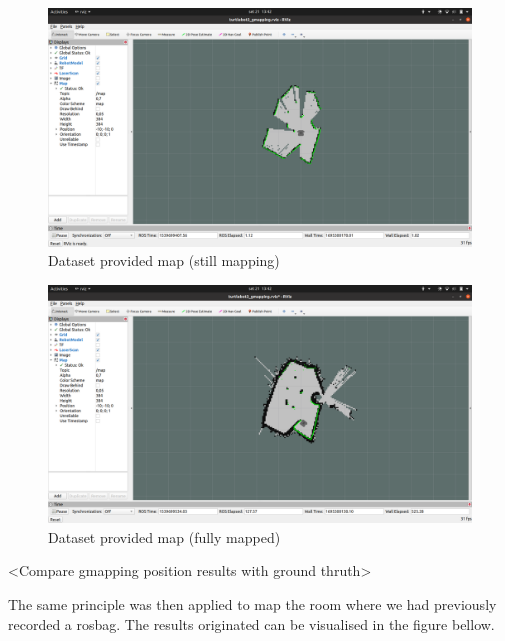 \begin{figure}[h]
\centering
\includegraphics[width=1.0\textwidth]{./Images/dataset_gmapping_initial_map}
\caption{Dataset provided map (still mapping)}
\label{fig:flowchart}
\end{figure}


\begin{figure}[h]
\centering
\includegraphics[width=1.0\textwidth]{./Images/dataset_gmapping_final_map}
\caption{Dataset provided map (fully mapped)}
\label{fig:flowchart}
\end{figure}

<Compare gmapping position results with ground thruth>

The same principle was then applied to map the room where we had previously recorded a rosbag. 
The results originated can be visualised in the figure bellow.


